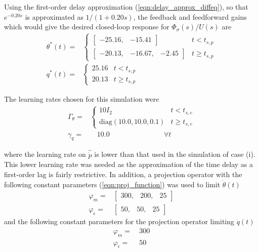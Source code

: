 Using the first-order delay approximation (\ref{eqn:delay_approx_diffeq}), so that $e^{-0.20 s}$ is approximated as $1/(1+0.20s)$, the feedback and feedforward gains which would give the desired closed-loop response for $\Phi_\sigma(s)/U(s)$ are
\begin{align}
	\theta^*(t) = & \begin{cases} \begin{bmatrix} -25.16, & -15.41 \end{bmatrix} & t < t_{s,p} \\ \begin{bmatrix}-20.13, & -16.67, & -2.45\end{bmatrix} & t \geq t_{s,p} \end{cases} \\
	q^*(t) = &\begin{cases} 25.16 & t < t_{s,p} \\ 20.13 & t \geq t_{s,p} \end{cases}
\end{align}

\noindent The learning rates chosen for this simulation were
\begin{align}
	\Gamma_\theta  = & \begin{cases}
		10 I_2 & t < t_{s,c}\\
		\text{diag}(10.0, 10.0, 0.1) & t \geq t_{s,c}
 	\end{cases} \\
	\gamma_q  = &\quad 10.0 \qquad ~ \qquad ~ \qquad ~ \quad \forall t
\end{align}

\noindent where the learning rate on $\hat{\dot{p}}$ is lower than that used in the simulation of case (i). This lower learning rate was needed as the approximation of the time delay as a first-order lag is fairly restrictive. In addition, a projection operator with the following constant parameters (\ref{eqn:proj_function}) was used to limit $\dot{\theta}(t)$
\begin{align}
	\varphi_m = & \begin{bmatrix}
		300, & 200, & 25
	\end{bmatrix} \\
	\varphi_{\epsilon} = & \begin{bmatrix}
		50, & 50, & 25
	\end{bmatrix}\end{align}
\noindent and the following constant parameters for the projection operator limiting $\dot{q}(t)$
\begin{align}
	\varphi_m = &~ 300\\
	\varphi_{\epsilon} = &~ 50
\end{align}

